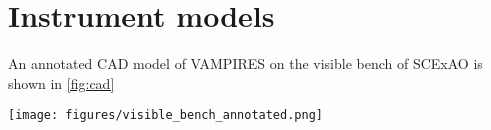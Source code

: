 \section{Instrument models\label{sec:models}}

An annotated CAD model of VAMPIRES on the visible bench of SCExAO is shown in \autoref{fig:cad}


\begin{figure*}
    \centering
    \texttt{[image: figures/visible\_bench\_annotated.png]}
    \caption{SCExAO visible bench including the PyWFS, FIRST injection, and VAMPIRES. VAMPIRES optics are labeled in orange and FIRST/PyWFS optics are labeled in red. The total size of the optical table shown is \SI{120}{\cm} by \SI{90}{\cm}. Parts of the baffling around VAMPIRES optics as well as the optical bench enclosure are hidden for clarity.\label{fig:cad}}
\end{figure*}

